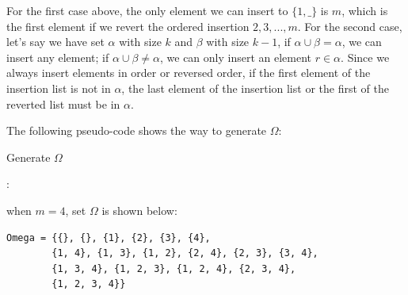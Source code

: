 \documentclass[11pt]{article}
\begin{document}
For the first case above, the only element we can insert to $\{1, \_\}$ is $m$, which is the first element if we revert the ordered insertion $2, 3, ..., m$. For the second case, let's say we have set $\alpha$ with size $k$ and $\beta$ with size $k-1$, if $\alpha \cup \beta = \alpha$, we can insert any element; if $\alpha \cup \beta \neq \alpha$, we can only insert an element $r \in \alpha$. Since we always insert elements in order or reversed order, if the first element of the insertion list is not in $\alpha$, the last element of the insertion list or the first of the reverted list must be in $\alpha$.

The following pseudo-code shows the way to generate $\Omega$: 

\begin{algorithm}[H] 
    \caption{Generate $\Omega$}
    \label{alg:loop}
    \begin{algorithmic}[1]
    \Ensure{$\Omega$}
                :
                \EndIf
                     
                \EndFor
            \EndFor
        \EndFor
        \State \Return {$\Omega$}
    \end{algorithmic}
\end{algorithm}

when $m=4$, set $\Omega$ is shown below:
\begin{lstlisting}
Omega = {{}, {}, {1}, {2}, {3}, {4}, 
        {1, 4}, {1, 3}, {1, 2}, {2, 4}, {2, 3}, {3, 4}, 
        {1, 3, 4}, {1, 2, 3}, {1, 2, 4}, {2, 3, 4}, 
        {1, 2, 3, 4}}
\end{lstlisting}


\end{document}
